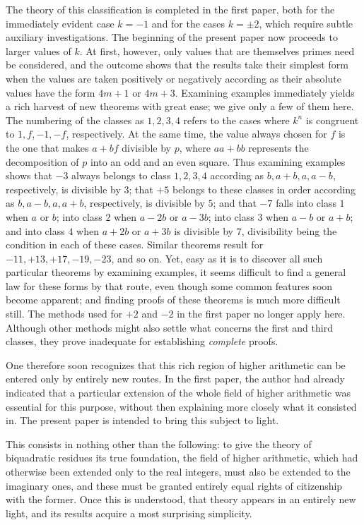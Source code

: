The theory of this classification is completed in the first paper, both for the immediately evident case $k=-1$ and for the cases $k=\pm2$, which require subtle auxiliary investigations. The beginning of the present paper now proceeds to larger values of $k$. At first, however, only values that are themselves primes need be considered, and the outcome shows that the results take their simplest form when the values are taken positively or negatively according as their absolute values have the form $4m+1$ or $4m+3$. Examining examples immediately yields a rich harvest of new theorems with great ease; we give only a few of them here. The numbering of the classes as $1,2,3,4$ refers to the cases where $k^n$ is congruent to $1,f,-1,-f$, respectively. At the same time, the value always chosen for $f$ is the one that makes $a+bf$ divisible by $p$, where $aa+bb$ represents the decomposition of $p$ into an odd and an even square. Thus examining examples shows that $-3$ always belongs to class $1,2,3,4$ according as $b,a+b,a,a-b$, respectively, is divisible by $3$; that $+5$ belongs to these classes in order according as $b,a-b,a,a+b$, respectively, is divisible by $5$; and that $-7$ falls into class $1$ when $a$ or $b$; into class $2$ when $a-2b$ or $a-3b$; into class $3$ when $a-b$ or $a+b$; and into class $4$ when $a+2b$ or $a+3b$ is divisible by $7$, divisibility being the condition in each of these cases. Similar theorems result for $-11,+13,+17,-19,-23$, and so on. Yet, easy as it is to discover all such particular theorems by examining examples, it seems difficult
to find a general law for these forms by that route, even though some common features soon become apparent; and finding proofs of these theorems is much more difficult still. The methods used for $+2$ and $-2$ in the first paper no longer apply here. Although other methods might also settle what concerns the first and third classes, they prove inadequate for establishing \emph{complete} proofs.

One therefore soon recognizes that this rich region of higher arithmetic can be entered only by entirely new routes. In the first paper, the author had already indicated that a particular extension of the whole field of higher arithmetic was essential for this purpose, without then explaining more closely what it consisted in. The present paper is intended to bring this subject to light.

This consists in nothing other than the following: to give the theory of biquadratic residues its true foundation, the field of higher arithmetic, which had otherwise been extended only to the real integers, must also be extended to the imaginary ones, and these must be granted entirely equal rights of citizenship with the former. Once this is understood, that theory appears in an entirely new light, and its results acquire a most surprising simplicity.

